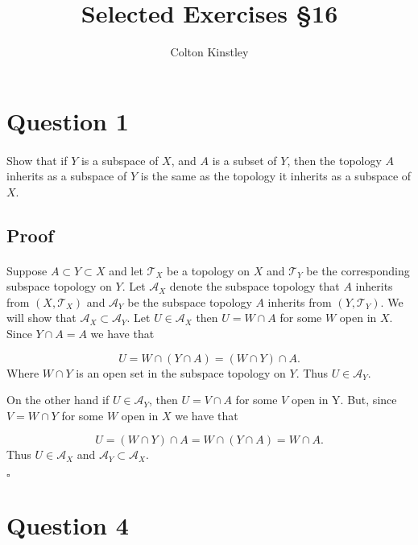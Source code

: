 \documentclass[11pt, oneside]{article}   	%
\title{Selected Exercises \S16}
\author{Colton Kinstley}
\newcommand{\scr}[1]{\mathscr{#1}}
\newcommand{\qed}{\begin{center}
$\square$
\end{center}}
\begin{document}
\maketitle


\section*{Question 1}
\paragraph{}
Show that if $Y$ is a subspace of $X$, and $A$ is a subset of $Y$, then the topology $A$ inherits as a subspace of $Y$ is the same as the topology it inherits as a subspace of $X$.

\subsection*{Proof}
\paragraph{}

Suppose $A \subset Y \subset X$ and let $\scr{T}_X$ be a topology on $X$ and $\scr{T}_Y$ be the corresponding subspace topology on $Y$. Let $\scr{A}_X$ denote the subspace topology that $A$ inherits from $(X,\scr{T}_X)$ and $\scr{A}_Y$ be the subspace topology $A$ inherits from $(Y,\scr{T}_Y)$. We will show that $\scr{A}_X \subset \scr{A}_Y$. Let $U \in \scr{A}_X$ then $U = W \cap A$ for some $W$ open in $X$. Since $Y \cap A = A$ we have that 

\[
U = W \cap (Y \cap A) = (W \cap Y) \cap A.
\]
Where $W \cap Y$ is an open set in the subspace topology on $Y$. Thus $U \in \scr{A}_Y$.

On the other hand if $U \in \scr{A}_Y$, then $U = V \cap A$ for some $V$ open in Y. But, since $V = W \cap Y$ for some $W$ open in $X$ we have that

\[
U = (W \cap Y) \cap A = W \cap (Y \cap A) = W \cap A.
\]
Thus $U \in \scr{A}_X$ and $\scr{A}_Y \subset \scr{A}_X$. \qed


\section*{Question 4}
\paragraph{}
\end{document}
